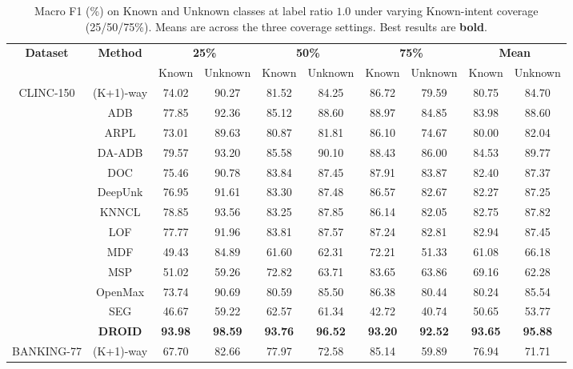\documentclass[journal,letterpaper]{IEEEtran}
\begin{document}
\begin{table}[!ht]
\centering
\caption{Macro F1 (\%) on Known and Unknown classes at label ratio $1.0$ under varying Known-intent coverage (25/50/75\%). Means are across the three coverage settings. Best results are \textbf{bold}.}
\label{Table:full-labeles-results}
\renewcommand{\arraystretch}{1.2}
\begin{tabular}{c c cc cc cc cc}
\toprule
\multirow{2}{*}{\textbf{Dataset}} & \multirow{2}{*}{\textbf{Method}} & \multicolumn{2}{c}{\textbf{25\%}} & \multicolumn{2}{c}{\textbf{50\%}} & \multicolumn{2}{c}{\textbf{75\%}} & \multicolumn{2}{c}{\textbf{Mean}} \\
\cmidrule(lr){3-4}\cmidrule(lr){5-6}\cmidrule(lr){7-8}\cmidrule(lr){9-10}
& & Known & Unknown & Known & Unknown & Known & Unknown & Known & Unknown \\
\midrule
\multirow{13}{*}{CLINC-150}
& (K+1)-way & 74.02 & 90.27 & 81.52 & 84.25 & 86.72 & 79.59 & 80.75 & 84.70 \\
& ADB & 77.85 & 92.36 & 85.12 & 88.60 & 88.97 & 84.85 & 83.98 & 88.60 \\
& ARPL & 73.01 & 89.63 & 80.87 & 81.81 & 86.10 & 74.67 & 80.00 & 82.04 \\
& DA-ADB & 79.57 & 93.20 & 85.58 & 90.10 & 88.43 & 86.00 & 84.53 & 89.77 \\
& DOC & 75.46 & 90.78 & 83.84 & 87.45 & 87.91 & 83.87 & 82.40 & 87.37 \\
& DeepUnk & 76.95 & 91.61 & 83.30 & 87.48 & 86.57 & 82.67 & 82.27 & 87.25 \\
& KNNCL & 78.85 & 93.56 & 83.25 & 87.85 & 86.14 & 82.05 & 82.75 & 87.82 \\
& LOF & 77.77 & 91.96 & 83.81 & 87.57 & 87.24 & 82.81 & 82.94 & 87.45 \\
& MDF & 49.43 & 84.89 & 61.60 & 62.31 & 72.21 & 51.33 & 61.08 & 66.18 \\
& MSP & 51.02 & 59.26 & 72.82 & 63.71 & 83.65 & 63.86 & 69.16 & 62.28 \\
& OpenMax & 73.74 & 90.69 & 80.59 & 85.50 & 86.38 & 80.44 & 80.24 & 85.54 \\
& SEG & 46.67 & 59.22 & 62.57 & 61.34 & 42.72 & 40.74 & 50.65 & 53.77 \\
\cmidrule{2-10}
& \textbf{DROID} & \textbf{93.98} & \textbf{98.59} & \textbf{93.76} & \textbf{96.52} & \textbf{93.20} & \textbf{92.52} & \textbf{93.65} & \textbf{95.88} \\
\midrule
\multirow{13}{*}{BANKING-77}
& (K+1)-way & 67.70 & 82.66 & 77.97 & 72.58 & 85.14 & 59.89 & 76.94 & 71.71 \\

\end{tabular}
\end{table}
\end{document}
